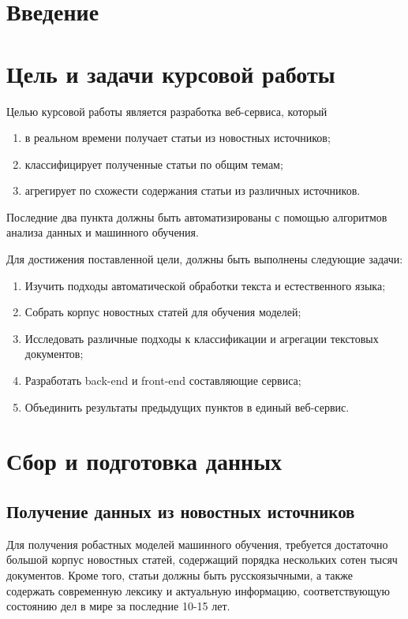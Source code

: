 \documentclass[a4paper, 14pt]{extarticle}
\begin{document}
\section{Введение}
\section{Цель и задачи курсовой работы}
Целью курсовой работы является разработка веб-сервиса, который
\begin{enumerate}
	\item в реальном времени получает статьи из новостных источников;
	\item классифицирует полученные статьи по общим темам;
	\item агрегирует по схожести содержания статьи из различных источников.
\end{enumerate}
Последние два пункта должны быть автоматизированы с помощью алгоритмов анализа данных и машинного обучения.

Для достижения поставленной цели, должны быть выполнены следующие задачи:
\begin{enumerate}
	\item Изучить подходы автоматической обработки текста и естественного языка;
	\item Собрать корпус новостных статей для обучения моделей;
	\item Исследовать различные подходы к классификации и агрегации текстовых документов;
	\item Разработать back-end и front-end составляющие сервиса;
	\item Объединить результаты предыдущих пунктов в единый веб-сервис.
\end{enumerate}
\section{Сбор и подготовка данных}
\subsection{Получение данных из новостных источников}
Для получения робастных моделей машинного обучения, требуется достаточно большой корпус новостных статей,
содержащий порядка нескольких сотен тысяч документов. Кроме того, статьи должны быть русскоязычными, а также
содержать современную лексику и актуальную информацию, соответствующую состоянию дел в мире за последние 10-15 лет.
\end{document}
